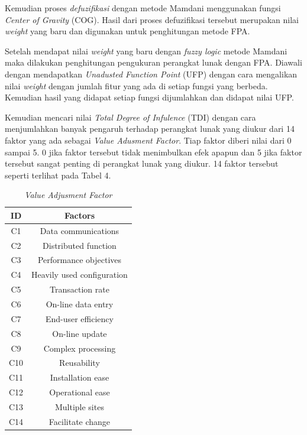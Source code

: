\documentclass[a4paper]{article}
\begin{document}
\begin{multicols}{2}
\par Kemudian proses \textit{defuzifikasi} dengan metode Mamdani menggunakan fungsi \textit{Center of Gravity} (COG). Hasil dari proses defuzifikasi tersebut merupakan nilai \textit{weight} yang baru dan digunakan untuk penghitungan metode FPA. 

\par Setelah mendapat nilai \textit{weight} yang baru dengan \textit{fuzzy logic} metode Mamdani maka dilakukan penghitungan pengukuran perangkat lunak dengan FPA. Diawali dengan mendapatkan \textit{Unadusted Function Point} (UFP) dengan cara mengalikan nilai \textit{weight} dengan jumlah fitur yang ada di setiap fungsi yang berbeda. Kemudian hasil yang didapat setiap fungsi dijumlahkan dan didapat nilai UFP.

\par Kemudian mencari nilai \textit{Total Degree of Infulence} (TDI) dengan cara menjumlahkan banyak pengaruh terhadap perangkat lunak yang diukur dari 14 faktor yang ada sebagai \textit{Value Adusment Factor}. Tiap faktor diberi nilai dari 0 sampai 5. 0 jika faktor tersebut tidak menimbulkan efek apapun dan 5 jika faktor tersebut sangat penting di perangkat lunak yang diukur. 14 faktor tersebut seperti terlihat pada Tabel 4.

\begin{table}[H]
    \centering
    \caption{\textit{Value Adjusment Factor}\citep{Jones2008}}
    \bigskip
    \begin{tabular}{|c|c|}
        \hline
        \textbf{ID} & \textbf{Factors}\\
        \hline
        C1 & Data communications\\
        C2 & Distributed function\\
        C3 & Performance objectives\\
        C4 & Heavily used configuration\\
        C5 & Transaction rate\\
        C6 & On-line data entry\\
        C7 & End-user efficiency\\
        C8 & On-line update\\
        C9 & Complex processing\\
        C10 & Reusability\\
        C11 & Installation ease\\
        C12 & Operational ease\\
        C13 & Multiple sites\\
        C14 & Facilitate change\\
        \hline
    \end{tabular}
    \label{tab4}
\end{table}


\end{multicols}
\end{document}
